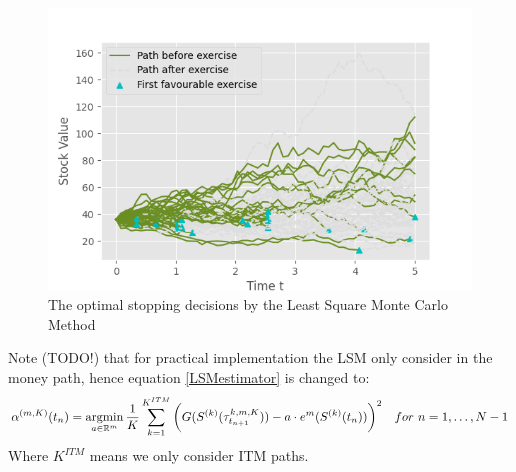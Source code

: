 \begin{figure}[th]
\centering
\includegraphics{Figures/LSMFit2.png}
\decoRule
\caption[Optimal Stopping Decision]{The optimal stopping decisions by the Least Square Monte Carlo Method}
\label{fig:LSM2}
\end{figure}

Note (TODO!) that for practical implementation the LSM only consider in the money path, hence equation \eqref{LSMestimator} is changed to:
\begin{equation*}
\alpha^{(m,K)}(t_n)= \operatorname*{argmin}_{a\in \mathbb{R}^m} \dfrac{1}{K}\sum_{k=1}^{K^{ITM}} \bigg(G(S^{(k)}(\tau^{k,m,K}_{t_{n+1}}))  -a \cdot e^m(S^{(k)}(t_{n})) \bigg)^2 \quad for \ n=1, \ldots, N-1
\end{equation*}
Where $K^{ITM}$ means we only consider ITM paths.


